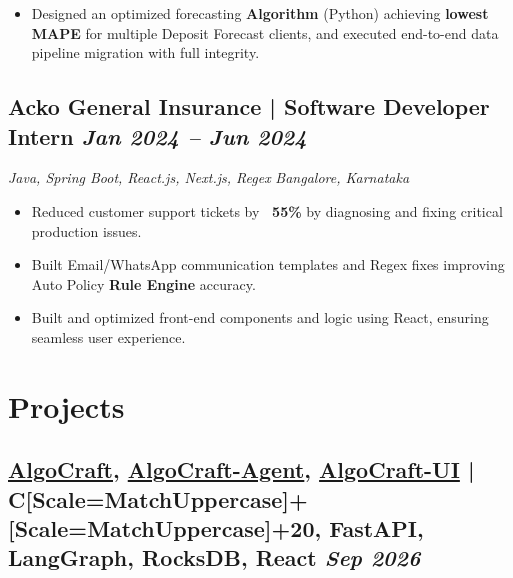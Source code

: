 \documentclass[a4paper,10pt]{article}
\newcommand{\asciplus}{{\fontspec{DejaVu Sans}[Scale=MatchUppercase]+}}
\newcommand{\CppTwenty}{C\asciplus\asciplus20}
\newcommand{\subtext}[1]{
#1\par\vspace{-0.2cm}}
\newenvironment{zitemize}{
\begin{itemize}\itemsep0pt \parskip0pt \parsep1pt}
{\end{itemize}\vspace{-0.7cm}}
\begin{document}
\begin{zitemize}
\item Designed an optimized forecasting \textbf{Algorithm} (Python) achieving \textbf{lowest MAPE} for multiple Deposit Forecast clients, and executed end-to-end data pipeline migration with full integrity.
\end{zitemize}
\vspace{0.1cm}

\subsection*{Acko General Insurance | Software Developer Intern \hfill {\small\textit{Jan 2024 – Jun 2024}}}
\subtext{\textit{Java, Spring Boot, React.js, Next.js, Regex} \hfill \textit{Bangalore, Karnataka}}
\begin{zitemize}
\item Reduced customer support tickets by \textbf{~55\%} by diagnosing and fixing critical production issues.
\item Built Email/WhatsApp communication templates and Regex fixes improving Auto Policy \textbf{Rule Engine} accuracy.
\item Built and optimized front-end components and logic using React, ensuring seamless user experience.
\end{zitemize}
\vspace{0.0cm}


\section{Projects}

\subsection*{\fontsize{10pt}{12pt}\selectfont\href{https://github.com/Ruhangrk/AlgoCraft}{{\textcolor{custompurple}{\mdseries AlgoCraft}}}, \href{https://github.com/Ruhangrk/AlgoCraft-Agent}{{\textcolor{custompurple}{\mdseries AlgoCraft-Agent}}}, \href{https://github.com/Ruhangrk/AlgoCraft-UI}{{\textcolor{custompurple}{\mdseries AlgoCraft-UI}}} | \CppTwenty, FastAPI, LangGraph, RocksDB, React \hfill {\small\textit{Sep 2026}}}
\end{document}
